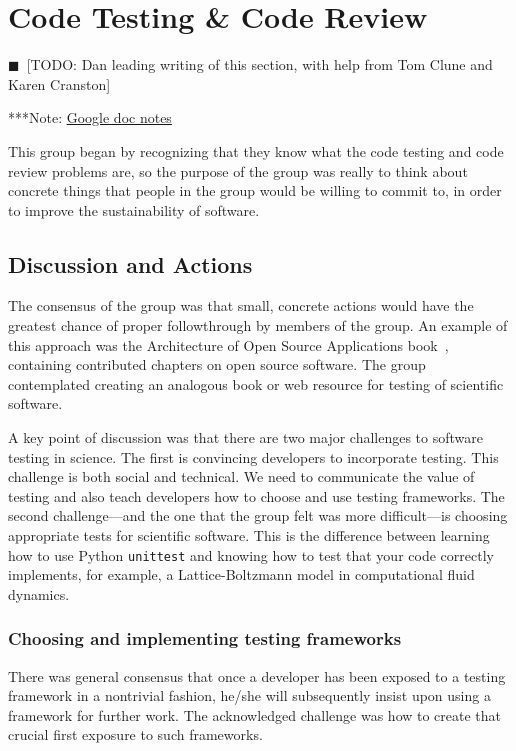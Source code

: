 \documentclass[11pt, oneside]{amsart}
\newcommand{\todo}[1]{{\color{blue}$\blacksquare$~\textsf{[TODO: #1]}}}
\newcommand{\note}[1]{ {\textcolor{blueish}    { ***Note:      #1 }}}
\begin{document}
\section{Code Testing \& Code Review} \label{sec:code_testing}
\todo{Dan leading writing of this section, with help from Tom Clune and Karen Cranston}

\note{\href{http://tinyurl.com/l5t5h45}{Google doc notes}}

This group began by recognizing that they know what the code testing and code
review problems are, so the purpose of the group was really to think about
concrete things that people in the group would be willing to commit to, in order
to improve the sustainability of software.

\subsection{Discussion and Actions}

The consensus of the group was that small, concrete actions would have the
greatest chance of proper followthrough by members of the group. An example of
this approach was the Architecture of Open Source Applications book~\cite{aosa},
containing contributed chapters on open source software. The group contemplated
creating an analogous book or web resource for testing of scientific software.

A key point of discussion was that there are two major challenges to software
testing in science. The first is convincing developers to incorporate testing.
This challenge is both social and technical. We need to communicate the value of
testing and also teach developers how to choose and use testing frameworks. The
second challenge---and the one that the group felt was more difficult---is
choosing appropriate tests for scientific software. This is the difference
between learning how to use Python \texttt{unittest} and knowing how to test
that your code correctly implements, for example, a Lattice-Boltzmann model in
computational fluid dynamics.

\subsubsection{Choosing and implementing testing frameworks} There was general
consensus that once a developer has been exposed to a testing framework in a
nontrivial fashion, he/she will subsequently insist upon using a framework for
further work. The acknowledged challenge was how to create that crucial first
exposure to such frameworks.
\end{document}
